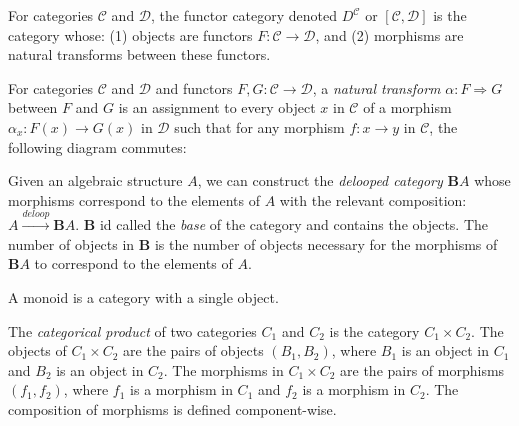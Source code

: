     \begin{definition}
        For categories $\mathcal{C}$ and $\mathcal{D}$, the functor category denoted $D^{\mathcal{C}}$ or $[\mathcal{C}, \mathcal{D}]$ is the category whose: (1) objects are functors $F: \mathcal{C} \to \mathcal{D}$, and (2) morphisms are natural transforms between these functors.
\end{definition}

\begin{definition}
    For categories $\mathcal{C}$ and $\mathcal{D}$ and functors $F,G: \mathcal{C} \to \mathcal{D}$, a \textit{natural transform} $\alpha: F \Rightarrow G$ between $F$ and $G$ is an assignment to every object $x$ in $\mathcal{C}$ of a morphism $\alpha_{x}: F(x) \to G(x)$ in $\mathcal{D}$ such that for any morphism $f: x \to y$ in $\mathcal{C}$, the following diagram commutes:
    
 \end{definition}

\begin{definition}
    Given an algebraic structure $A$, we can construct the \textit{delooped category} $\textbf{B}A$ whose morphisms correspond to the elements of $A$ with the relevant composition: $A \xrightarrow{deloop} \textbf{B}A$.
    $\textbf{B}$ id called the \textit{base} of the category and contains the objects.
    The number of objects in $\textbf{B}$ is the number of objects necessary for the morphisms of $\textbf{B}A$ to correspond to the elements of $A$.
\end{definition}

\begin{definition}[Monoid]\label{def:monoid}
    A monoid is a category with a single object.
\end{definition}


\begin{definition}
    The \textit{categorical product} of two categories $C_{1}$ and $C_{2}$ is the category $C_{1} \times C_{2}$.
    The objects of $C_{1} \times C_{2}$ are the pairs of objects $(B_{1}, B_{2})$, where $B_{1}$ is an object in $C_{1}$ and $B_{2}$ is an object in $C_{2}$.
    The morphisms in $C_{1} \times C_{2}$ are the pairs of morphisms $(f_{1}, f_{2})$, where $f_{1}$ is a morphism in $C_{1}$ and $f_{2}$ is a morphism in $C_{2}$.
    The composition of morphisms is defined component-wise.
\end{definition}

